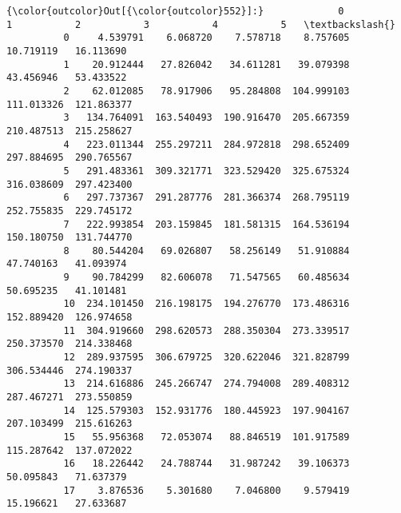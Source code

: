 \documentclass[11pt]{article}
\begin{document}
\begin{Verbatim}[commandchars=\\\{\}]
{\color{outcolor}Out[{\color{outcolor}552}]:}             0           1           2           3           4           5   \textbackslash{}
          0     4.539791    6.068720    7.578718    8.757605   10.719119   16.113690   
          1    20.912444   27.826042   34.611281   39.079398   43.456946   53.433522   
          2    62.012085   78.917906   95.284808  104.999103  111.013326  121.863377   
          3   134.764091  163.540493  190.916470  205.667359  210.487513  215.258627   
          4   223.011344  255.297211  284.972818  298.652409  297.884695  290.765567   
          5   291.483361  309.321771  323.529420  325.675324  316.038609  297.423400   
          6   297.737367  291.287776  281.366374  268.795119  252.755835  229.745172   
          7   222.993854  203.159845  181.581315  164.536194  150.180750  131.744770   
          8    80.544204   69.026807   58.256149   51.910884   47.740163   41.093974   
          9    90.784299   82.606078   71.547565   60.485634   50.695235   41.101481   
          10  234.101450  216.198175  194.276770  173.486316  152.889420  126.974658   
          11  304.919660  298.620573  288.350304  273.339517  250.373570  214.338468   
          12  289.937595  306.679725  320.622046  321.828799  306.534446  274.190337   
          13  214.616886  245.266747  274.794008  289.408312  287.467271  273.550859   
          14  125.579303  152.931776  180.445923  197.904167  207.103499  215.616263   
          15   55.956368   72.053074   88.846519  101.917589  115.287642  137.072022   
          16   18.226442   24.788744   31.987242   39.106373   50.095843   71.637379   
          17    3.876536    5.301680    7.046800    9.579419   15.196621   27.633687   
          

\end{Verbatim}
\end{document}
